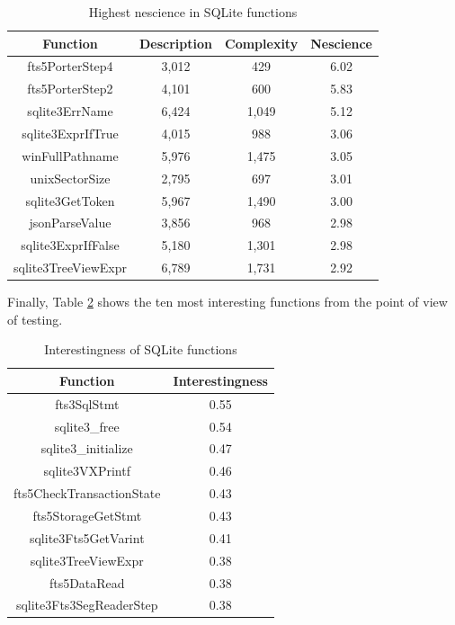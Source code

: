 \begin{table}
\begin{centering}
\begin{tabular}{|c|c|c|c|}
\hline 
Function & Description & Complexity & Nescience \tabularnewline
\hline 
\hline
fts5PorterStep4 & 3,012 & 429 & 6.02 \tabularnewline
fts5PorterStep2 & 4,101 & 600 & 5.83 \tabularnewline
sqlite3ErrName & 6,424 & 1,049 & 5.12 \tabularnewline
sqlite3ExprIfTrue & 4,015 & 988 & 3.06 \tabularnewline
winFullPathname & 5,976 & 1,475 & 3.05 \tabularnewline
unixSectorSize & 2,795 & 697 & 3.01 \tabularnewline
sqlite3GetToken & 5,967 & 1,490 & 3.00 \tabularnewline
jsonParseValue & 3,856 & 968 & 2.98 \tabularnewline
sqlite3ExprIfFalse & 5,180 & 1,301 & 2.98 \tabularnewline
sqlite3TreeViewExpr & 6,789 & 1,731 & 2.92 \tabularnewline
\hline
\end{tabular}
\par\end{centering}
\caption{\label{tab:Top-Nescience-SQLite}Highest nescience in SQLite functions}
\end{table}

Finally, Table \ref{tab:Interestingness-SQLite} shows the ten most interesting functions from the point of view of testing. %

\begin{table}
\begin{centering}
\begin{tabular}{|c|c|}
\hline 
Function & Interestingness \tabularnewline
\hline 
\hline
fts3SqlStmt & 0.55 \tabularnewline
sqlite3\_free & 0.54 \tabularnewline
sqlite3\_initialize & 0.47 \tabularnewline
sqlite3VXPrintf & 0.46 \tabularnewline
fts5CheckTransactionState & 0.43 \tabularnewline
fts5StorageGetStmt & 0.43 \tabularnewline
sqlite3Fts5GetVarint & 0.41 \tabularnewline
sqlite3TreeViewExpr & 0.38 \tabularnewline
fts5DataRead & 0.38 \tabularnewline
sqlite3Fts3SegReaderStep & 0.38 \tabularnewline
\hline
\end{tabular}
\par\end{centering}
\caption{\label{tab:Interestingness-SQLite}Interestingness of SQLite functions}
\end{table}

%
%


